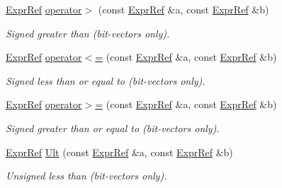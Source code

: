 \begin{DoxyCompactItemize}
\mbox{\label{namespaceilang_a130a794f0f175d58089d16bcaabb91ae}} 
\mbox{\hyperlink{classilang_1_1_expr_ref}{Expr\+Ref}} \mbox{\hyperlink{namespaceilang_a130a794f0f175d58089d16bcaabb91ae}{operator$>$}} (const \mbox{\hyperlink{classilang_1_1_expr_ref}{Expr\+Ref}} \&a, const \mbox{\hyperlink{classilang_1_1_expr_ref}{Expr\+Ref}} \&b)
\begin{DoxyCompactList}\small\item\em Signed greater than (bit-\/vectors only). \end{DoxyCompactList}\item 
\mbox{\label{namespaceilang_aa6fd64da42d7b62d90e7723fd9b99155}} 
\mbox{\hyperlink{classilang_1_1_expr_ref}{Expr\+Ref}} \mbox{\hyperlink{namespaceilang_aa6fd64da42d7b62d90e7723fd9b99155}{operator$<$=}} (const \mbox{\hyperlink{classilang_1_1_expr_ref}{Expr\+Ref}} \&a, const \mbox{\hyperlink{classilang_1_1_expr_ref}{Expr\+Ref}} \&b)
\begin{DoxyCompactList}\small\item\em Signed less than or equal to (bit-\/vectors only). \end{DoxyCompactList}\item 
\mbox{\label{namespaceilang_a7a3c66d75773fcf81726ef3225bf73be}} 
\mbox{\hyperlink{classilang_1_1_expr_ref}{Expr\+Ref}} \mbox{\hyperlink{namespaceilang_a7a3c66d75773fcf81726ef3225bf73be}{operator$>$=}} (const \mbox{\hyperlink{classilang_1_1_expr_ref}{Expr\+Ref}} \&a, const \mbox{\hyperlink{classilang_1_1_expr_ref}{Expr\+Ref}} \&b)
\begin{DoxyCompactList}\small\item\em Signed greater than or equal to (bit-\/vectors only). \end{DoxyCompactList}\item 
\mbox{\label{namespaceilang_a682d30cc567f56a578def19edd36f92a}} 
\mbox{\hyperlink{classilang_1_1_expr_ref}{Expr\+Ref}} \mbox{\hyperlink{namespaceilang_a682d30cc567f56a578def19edd36f92a}{Ult}} (const \mbox{\hyperlink{classilang_1_1_expr_ref}{Expr\+Ref}} \&a, const \mbox{\hyperlink{classilang_1_1_expr_ref}{Expr\+Ref}} \&b)
\begin{DoxyCompactList}\small\item\em Unsigned less than (bit-\/vectors only). \end{DoxyCompactList}\item 

\end{DoxyCompactItemize}
